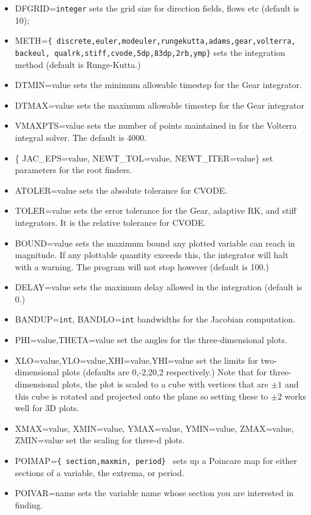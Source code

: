\begin{itemize}
(default is 40).
\item DFGRID={\tt integer} sets the grid size for direction fields, flows etc (default is 10);
\item METH={\tt \{
discrete,euler,modeuler,rungekutta,adams,gear,volterra, backeul,
qualrk,stiff,cvode,5dp,83dp,2rb,ymp\}}
sets the integration method (default is Runge-Kutta.)
\item DTMIN=value sets the minimum allowable timestep for the Gear
integrator.
\item DTMAX=value sets the maximum allowable timestep for the Gear
integrator
\item VMAXPTS=value sets the number of points maintained in for the
Volterra integral solver. The default is 4000.
\item \{ JAC\_EPS=value, NEWT\_TOL=value, NEWT\_ITER=value\} set
parameters for the root finders.
\item ATOLER=value sets the absolute tolerance for CVODE.
\item TOLER=value sets the error tolerance for the Gear, adaptive RK,
and stiff integrators. It is the relative tolerance for CVODE. 
\item BOUND=value sets the maximum bound any plotted variable can
reach in magnitude. If any plottable quantity exceeds this, the
integrator will halt with a warning.  The program will not stop
however (default is 100.)
\item DELAY=value sets the maximum delay allowed in the integration
(default is 0.)
\item BANDUP={\tt int}, BANDLO={\tt int} bandwidths for the Jacobian computation. 
\item PHI=value,THETA=value set the angles for the three-dimensional
plots.
\item XLO=value,YLO=value,XHI=value,YHI=value set the limits for
two-dimensional plots (defaults are 0,-2,20,2 respectively.) Note that
for three-dimensional plots, the plot is scaled to a cube with
vertices that are $\pm1$ and this cube is rotated and projected onto
the plane so setting these to $\pm2$ works well for 3D plots.
\item
XMAX=value, XMIN=value, YMAX=value, YMIN=value, ZMAX=value, ZMIN=value set
the scaling for three-d plots.
\item POIMAP={\tt \{ section,maxmin, period\} } sets up a Poincare map for
either sections of a variable, the extrema, or period.  
\item POIVAR=name sets the variable name whose section you are
interested in finding.

\end{itemize}
